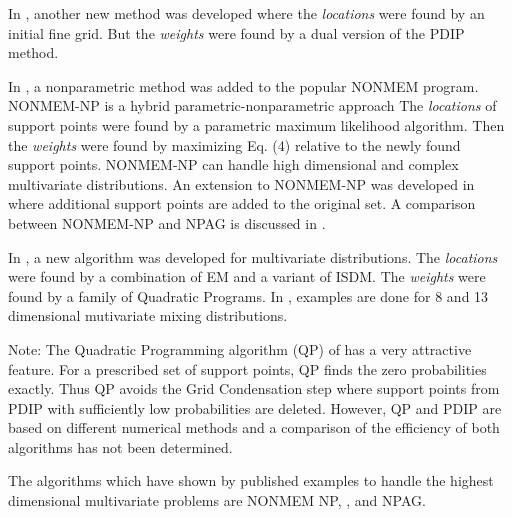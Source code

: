 %


In  \citet*{Pilla2006}, another new method was developed where
the {\em locations} were found by an initial fine grid. But the   {\em weights} were found by a dual version of the PDIP method.

In  \citet* {Savic1},
a nonparametric method was added to the popular NONMEM program. NONMEM-NP   is a hybrid parametric-nonparametric approach %
The {\em locations} of support points were found by a parametric maximum likelihood algorithm. Then the {\em weights} were found by maximizing Eq. (4) relative to the newly found support points. 
NONMEM-NP can handle high dimensional and complex multivariate distributions. An extension to NONMEM-NP was developed in %
\citet{Savic2}
where additional support points are added to the original set. A comparison between NONMEM-NP and NPAG is discussed in \citet*{Leary2017}.


In %
\citet{Wang2015} ,
a new algorithm was developed for multivariate distributions. The {\em locations} were found by a combination of EM and a variant of ISDM. The {\em weights} were found by a family  of Quadratic Programs.  In \cite{Wang2015}, examples are done for 8 and 13 dimensional mutivariate mixing distributions. 

Note: The Quadratic Programming algorithm (QP) of  \citet{Wang2015} has a very attractive feature. For a prescribed set of support points, QP finds the zero probabilities exactly. Thus QP avoids the Grid Condensation step where support points from PDIP with sufficiently low probabilities are deleted. However, QP and PDIP are based on different numerical methods and a comparison of the efficiency of both algorithms has not been determined.

The algorithms which have shown by published examples to handle the highest dimensional multivariate problems are NONMEM NP, \citet{Wang2015},  and NPAG.




